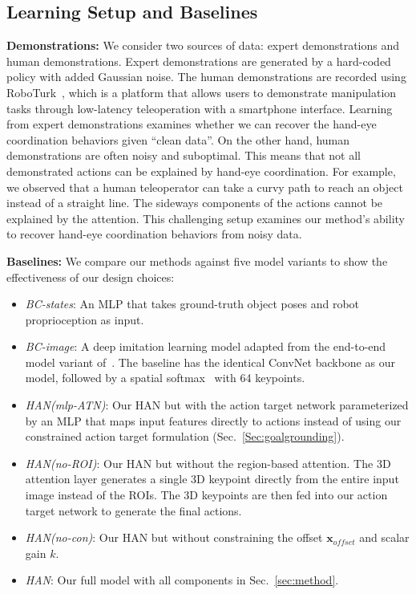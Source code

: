 \documentclass[letterpaper, 10 pt, conference]{ieeeconf}
\newcommand{\algoName}{HAN\xspace}
\begin{document}
\subsection{Learning Setup and Baselines}
\label{sec:demo-baselines}
\textbf{Demonstrations:} We consider two sources of data: expert demonstrations and human demonstrations. Expert demonstrations are generated by a hard-coded policy with added Gaussian noise. The human demonstrations are recorded using RoboTurk~\cite{mandlekar2018roboturk, mandlekar2019roboturk}, which is a platform that allows users to demonstrate manipulation tasks through low-latency teleoperation with a smartphone interface. Learning from expert demonstrations examines whether we can recover the hand-eye coordination behaviors given ``clean data''. On the other hand, human demonstrations are often noisy and suboptimal. This means that not all demonstrated actions can be explained by hand-eye coordination. For example, we observed that a human teleoperator can take a curvy path to reach an object instead of a straight line. The sideways components of the actions cannot be explained by the attention. This challenging setup examines our method's ability to recover hand-eye coordination behaviors from noisy data.

\textbf{Baselines:} We compare our methods against five model variants to show the effectiveness of our design choices:
\begin{itemize}
    \item \textit{BC-states}: An MLP that takes ground-truth object poses and robot proprioception as input.
    \item \textit{BC-image}: A deep imitation learning model adapted from the end-to-end model variant of~\cite{florence2019self}. The baseline has the identical ConvNet backbone as our model, followed by a spatial softmax~\cite{ssmax} with 64 keypoints.
    \item \textit{\algoName (mlp-ATN)}: Our \algoName but with the action target network parameterized by an MLP that maps input features directly to actions instead of using our constrained action target formulation (Sec.~\ref{Sec:goalgrounding}).
    \item \textit{\algoName (no-ROI)}: Our \algoName but without the region-based attention. The 3D attention layer generates a single 3D keypoint directly from the entire input image instead of the ROIs. The 3D keypoints are then fed into our action target network to generate the final actions.
    \item \textit{\algoName (no-con)}: Our \algoName but without constraining the offset $\mathbf{x}_{offset}$ and scalar gain $k$.
    \item \textit{\algoName}: Our full model with all components in Sec.~\ref{sec:method}.
\end{itemize}
\end{document}
